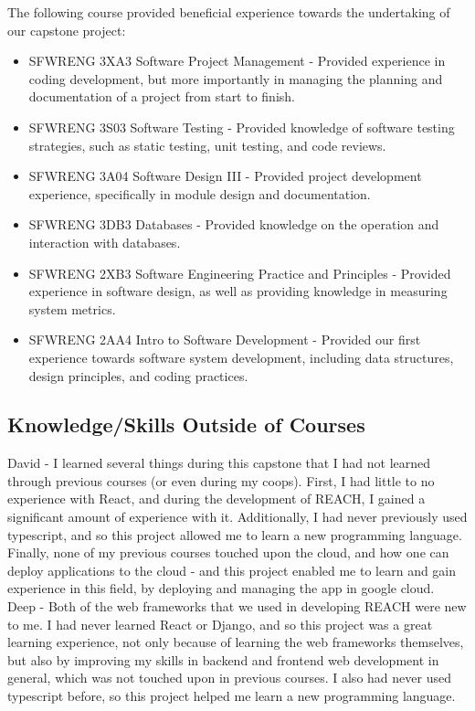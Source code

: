 \documentclass{article}
\begin{document}
The following course provided beneficial experience towards the undertaking of our capstone project:
\begin{itemize}
	\item SFWRENG 3XA3 Software Project Management - Provided experience in coding development, but more importantly in managing the planning and documentation of a project from start to finish.
	\item SFWRENG 3S03 Software Testing - Provided knowledge of software testing strategies, such as static testing, unit testing, and code reviews.
	\item SFWRENG 3A04 Software Design III - Provided project development experience, specifically in module design and documentation.
	\item SFWRENG 3DB3 Databases - Provided knowledge on the operation and interaction with databases.
	\item SFWRENG 2XB3 Software Engineering Practice and Principles - Provided experience in software design, as well as providing knowledge in measuring system metrics.
	\item SFWRENG 2AA4 Intro to Software Development - Provided our first experience towards software system development, including data structures, design principles, and coding practices.
\end{itemize}

\subsection{Knowledge/Skills Outside of Courses}


    David - I learned several things during this capstone that I had not learned through previous courses (or even during my coops). First, 
    I had little to no experience with React, and during the development of REACH, I gained a significant amount of experience with it. Additionally,
    I had never previously used typescript, and so this project allowed me to learn a new programming language. Finally, none of my previous 
    courses touched upon the cloud, and how one can deploy applications to the cloud - and this project enabled me to learn and gain experience in this 
    field, by deploying and managing the app in google cloud.\\

    Deep - Both of the web frameworks that we used in developing REACH were new to me. I had never learned React or Django, and so this project
    was a great learning experience, not only because of learning the web frameworks themselves, but also by improving my skills in 
    backend and frontend web development in general, which was not touched upon in previous courses. I also had never used typescript before, so this project helped me learn a new programming language.\\
\end{document}

